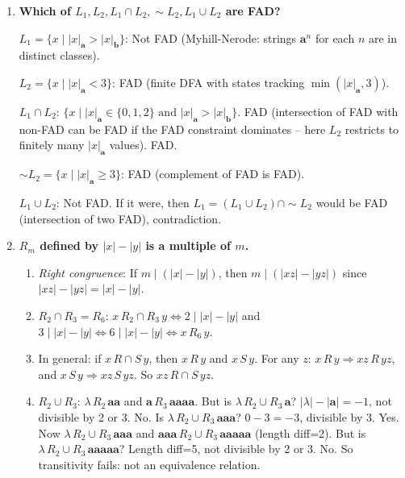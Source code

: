 \begin{enumerate}[{2.}1.]
\item \textbf{Which of $L_1,L_2,L_1\cap L_2,\sim L_2,L_1\cup L_2$ are FAD?}

$L_1=\{x\mid|x|_\mathbf{a}>|x|_\mathbf{b}\}$: Not FAD (Myhill-Nerode: strings $\mathbf{a}^n$ for each $n$ are in distinct classes).

$L_2=\{x\mid|x|_\mathbf{a}<3\}$: FAD (finite DFA with states tracking $\min(|x|_\mathbf{a},3)$).

$L_1\cap L_2$: $\{x\mid|x|_\mathbf{a}\in\{0,1,2\}\text{ and }|x|_\mathbf{a}>|x|_\mathbf{b}\}$. FAD (intersection of FAD with non-FAD can be FAD if the FAD constraint dominates -- here $L_2$ restricts to finitely many $|x|_\mathbf{a}$ values). FAD.

$\sim L_2=\{x\mid|x|_\mathbf{a}\geq 3\}$: FAD (complement of FAD is FAD).

$L_1\cup L_2$: Not FAD. If it were, then $L_1=(L_1\cup L_2)\cap\sim L_2$ would be FAD (intersection of two FAD), contradiction.

\item \textbf{$R_m$ defined by $|x|-|y|$ is a multiple of $m$.}

\begin{enumerate}
\item \textit{Right congruence}: If $m\mid(|x|-|y|)$, then $m\mid(|xz|-|yz|)$ since $|xz|-|yz|=|x|-|y|$.

\item $R_2\cap R_3 = R_6$: $x\,R_2\cap R_3\,y\Leftrightarrow 2\mid|x|-|y|$ and $3\mid|x|-|y|\Leftrightarrow 6\mid|x|-|y|\Leftrightarrow x\,R_6\,y$.

\item In general: if $x\,R\cap S\,y$, then $x\,R\,y$ and $x\,S\,y$. For any $z$: $x\,R\,y\Rightarrow xz\,R\,yz$, and $x\,S\,y\Rightarrow xz\,S\,yz$. So $xz\,R\cap S\,yz$.

\item $R_2\cup R_3$: $\lambda\,R_2\,\mathbf{aa}$ and $\mathbf{a}\,R_3\,\mathbf{aaaa}$. But is $\lambda\,R_2\cup R_3\,\mathbf{a}$? $|\lambda|-|\mathbf{a}|=-1$, not divisible by 2 or 3. No. Is $\lambda\,R_2\cup R_3\,\mathbf{aaa}$? $0-3=-3$, divisible by 3. Yes. Now $\lambda\,R_2\cup R_3\,\mathbf{aaa}$ and $\mathbf{aaa}\,R_2\cup R_3\,\mathbf{aaaaa}$ (length diff=2). But is $\lambda\,R_2\cup R_3\,\mathbf{aaaaa}$? Length diff=5, not divisible by 2 or 3. No. So transitivity fails: not an equivalence relation.


\end{enumerate}
\end{enumerate}
